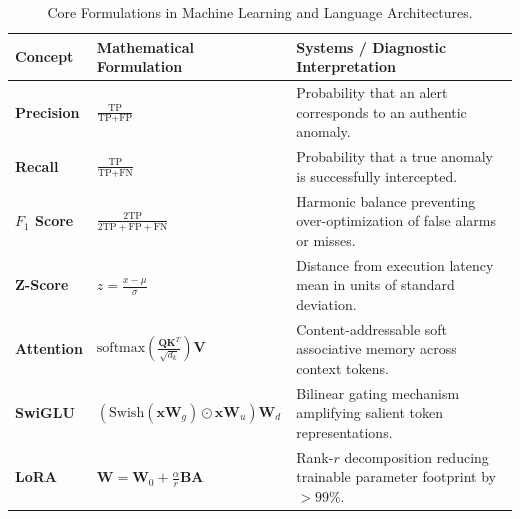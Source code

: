 \documentclass[11pt,a4paper]{article}
\begin{document}
\begin{table}[htbp]
\centering
\small
\renewcommand{\arraystretch}{1.4}
\begin{tabularx}{\textwidth}{l p{4.5cm} X}
\toprule
\textbf{Concept} & \textbf{Mathematical Formulation} & \textbf{Systems / Diagnostic Interpretation} \\
\midrule
\textbf{Precision} & $\frac{\text{TP}}{\text{TP} + \text{FP}}$ & Probability that an alert corresponds to an authentic anomaly. \\
\textbf{Recall} & $\frac{\text{TP}}{\text{TP} + \text{FN}}$ & Probability that a true anomaly is successfully intercepted. \\
\textbf{$F_1$ Score} & $\frac{2\text{TP}}{2\text{TP} + \text{FP} + \text{FN}}$ & Harmonic balance preventing over-optimization of false alarms or misses. \\
\textbf{Z-Score} & $z = \frac{x - \mu}{\sigma}$ & Distance from execution latency mean in units of standard deviation. \\
\textbf{Attention} & $\text{softmax}\left(\frac{\bm{Q}\bm{K}^T}{\sqrt{d_k}}\right)\bm{V}$ & Content-addressable soft associative memory across context tokens. \\
\textbf{SwiGLU} & $(\text{Swish}(\bm{x}\bm{W}_g) \odot \bm{x}\bm{W}_u)\bm{W}_d$ & Bilinear gating mechanism amplifying salient token representations. \\
\textbf{LoRA} & $\bm{W} = \bm{W}_0 + \frac{\alpha}{r}\bm{B}\bm{A}$ & Rank-$r$ decomposition reducing trainable parameter footprint by $>99\%$. \\
\bottomrule
\end{tabularx}
\caption{Core Formulations in Machine Learning and Language Architectures.}
\end{table}
\end{document}
